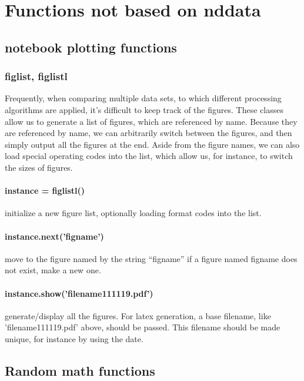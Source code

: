 \section{Functions not based on nddata}\label{sec:writeup_sofware_Pyspec_nonnddata}
\subsection{notebook plotting functions}
\subsubsection{figlist, figlistl}
Frequently, when comparing multiple data sets,
    to which different processing algorithms are applied,
    it's difficult to keep track of the figures.
These classes allow us to generate a list of figures,
    which are referenced by name.
Because they are referenced by name, we can arbitrarily
    switch between the figures,
    and then simply output all the figures at the end.
Aside from the figure names, we can also load special operating
    codes into the list, which allow us, for instance,
    to switch the sizes of figures.
    \paragraph{instance = figlistl()} initialize a new figure list,
        optionally loading format codes into the list.
    \paragraph{instance.next('figname')} move to the figure named by the string ``figname''
    if a figure named figname does not exist, make a new one.
    \paragraph{instance.show('filename111119.pdf')} generate/display
        all the figures.
        For latex generation, a base filename, like 'filename111119.pdf' above, should be passed.
        This filename should be made unique, for instance by using the date.
\subsection{Random math functions}
